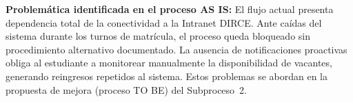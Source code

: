 \noindent
\textbf{Problem\'atica identificada en el proceso AS IS:} El flujo actual presenta
dependencia total de la conectividad a la Intranet DIRCE. Ante ca\'idas del sistema
durante los turnos de matr\'icula, el proceso queda bloqueado sin procedimiento
alternativo documentado. La ausencia de notificaciones proactivas obliga al
estudiante a monitorear manualmente la disponibilidad de vacantes, generando reingresos
repetidos al sistema. Estos problemas se abordan en la propuesta de mejora (proceso
TO BE) del Subproceso~2.
